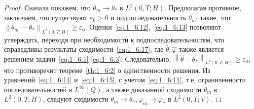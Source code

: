 \begin{proof}
    Сначала покажем, что $\theta_{m} \rightarrow \theta_{*}$ в $L^{2}(0, T ; H)$.
    Предполагая противное, заключаем, что существуют $\varepsilon_{0}>0$ и подпоследовательность
    $\theta_{m^{\prime}}$ такие,
    что $\left\|\theta_{m^{\prime}}-\theta_{*}\right\|_{L^{2}(0, T ; H)} \geq \varepsilon_{0}$.
    Оценки~\eqref{eq:1_6:12},~\eqref{eq:1_6:13} позволяют утверждать,
    переходя при необходимости к подпоследовательностям,
    что справедливы результаты сходимости~\eqref{eq:1_6:17}, где $\widehat{\theta}, \widehat{\varphi}$
    также является решением задачи~\eqref{eq:1_6:1}-\eqref{eq:1_6:3}.
    Следовательно, $\left\|\widehat{\theta}-\theta_{*}\right\|_{L^{2}(0, T ; H)} \geq \varepsilon_{0}$,
    что противоречит теореме~\ref{th:1_6:2} о единственности решения.
    Из уравнений~\eqref{eq:1_6:14} и~\eqref{eq:1_6:15}, с учетом~\eqref{eq:1_6:11},
    т.е. ограниченности последовательностей
    в $L^{\infty}(Q)$, а также доказанной
    сходимости $\theta_{m}$ в $L^{2}(0, T ; H)$,
    следуют сходимости $\theta_{m} \rightarrow \theta_{*},
    \varphi_{m} \rightarrow \varphi_ {*}$ в $L^{2}(0, T ; V)$.
\end{proof}
